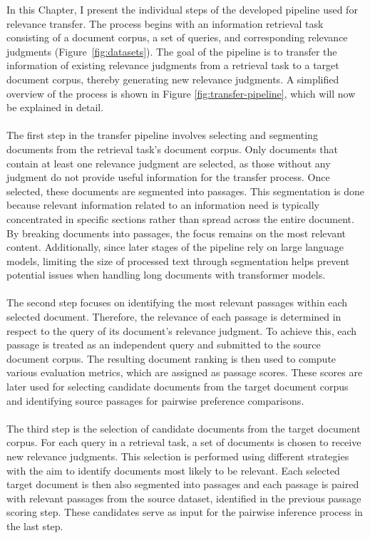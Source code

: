 In this Chapter, I present the individual steps of the developed pipeline used for relevance transfer. The process begins with an information retrieval task consisting of a document corpus, a set of queries, and corresponding relevance judgments (Figure~\ref{fig:datasets}). The goal of the pipeline is to transfer the information of existing relevance judgments from a retrieval task to a target document corpus, thereby generating new relevance judgments. A simplified overview of the process is shown in Figure \ref{fig:transfer-pipeline}, which will now be explained in detail.
\\\\
The first step in the transfer pipeline involves selecting and segmenting documents from the retrieval task's document corpus. Only documents that contain at least one relevance judgment are selected, as those without any judgment do not provide useful information for the transfer process. Once selected, these documents are segmented into passages. This segmentation is done because relevant information related to an information need is typically concentrated in specific sections rather than spread across the entire document. By breaking documents into passages, the focus remains on the most relevant content. Additionally, since later stages of the pipeline rely on large language models, limiting the size of processed text through segmentation helps prevent potential issues when handling long documents with transformer models.
\\\\
The second step focuses on identifying the most relevant passages within each selected document. Therefore, the relevance of each passage is determined in respect to the query of its document's relevance judgment. To achieve this, each passage is treated as an independent query and submitted to the source document corpus. The resulting document ranking is then used to compute various evaluation metrics, which are assigned as passage scores. These scores are later used for selecting candidate documents from the target document corpus and identifying source passages for pairwise preference comparisons.
\\\\
The third step is the selection of candidate documents from the target document corpus. For each query in a retrieval task, a set of documents is chosen to receive new relevance judgments. This selection is performed using different strategies with the aim to identify documents most likely to be relevant. Each selected target document is then also segmented into passages and each passage is paired with relevant passages from the source dataset, identified in the previous passage scoring step. These candidates serve as input for the pairwise inference process in the last step.
